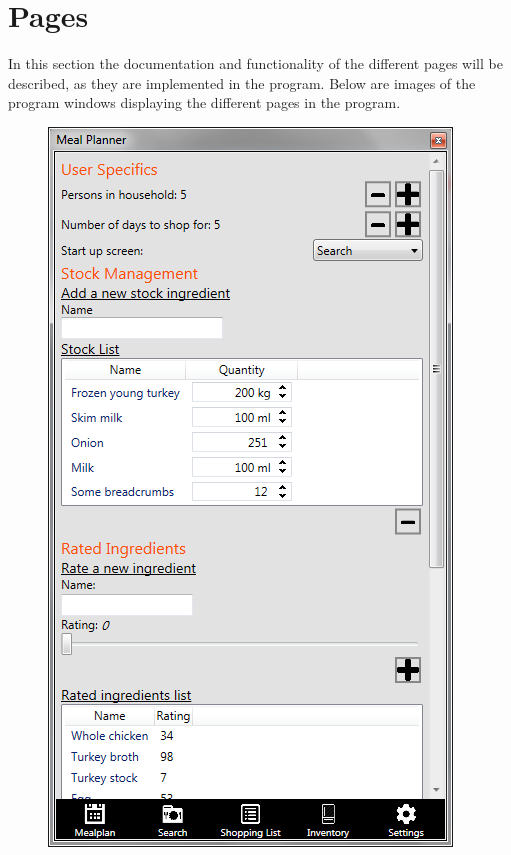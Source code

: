 \chapter{Pages} \label{PagesLabel}
In this section the documentation and functionality of the different pages will be described, as they are implemented in the program. Below are images of the program windows displaying the different pages in the program.

\begin{figure}[H]
\centering
\begin{minipage}{.33\textwidth}
  \centering
  \includegraphics[width=.9\linewidth]{Grafik/SettingsPage}
  \label{fig:SettnigsPage}

\end{minipage}
\end{figure}
